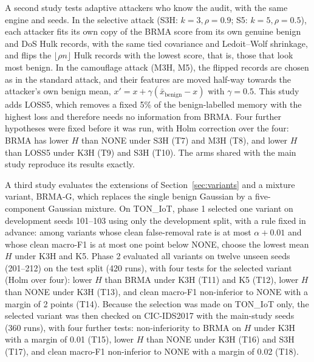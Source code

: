 \documentclass[pdflatex,sn-mathphys-num]{sn-jnl}
\theoremstyle{thmstyleone}
\theoremstyle{thmstylethree}
\begin{document}
A second study tests adaptive attackers who know the audit, with the same engine and seeds. In the selective attack (S3H: $k=3,\rho=0.9$; S5: $k=5,\rho=0.5$), each attacker fits its own copy of the BRMA score from its own genuine benign and DoS Hulk records, with the same tied covariance and Ledoit--Wolf shrinkage, and flips the $\lfloor\rho n\rfloor$ Hulk records with the lowest score, that is, those that look most benign. In the camouflage attack (M3H, M5), the flipped records are chosen as in the standard attack, and their features are moved half-way towards the attacker's own benign mean, $x'=x+\gamma(\bar x_{\mathrm{benign}}-x)$ with $\gamma=0.5$. This study adds LOSS5, which removes a fixed 5\% of the benign-labelled memory with the highest loss and therefore needs no information from BRMA. Four further hypotheses were fixed before it was run, with Holm correction over the four: BRMA has lower $H$ than NONE under S3H (T7) and M3H (T8), and lower $H$ than LOSS5 under K3H (T9) and S3H (T10). The arms shared with the main study reproduce its results exactly.

A third study evaluates the extensions of Section~\ref{sec:variants} and a mixture variant, BRMA-G, which replaces the single benign Gaussian by a five-component Gaussian mixture. On TON\_IoT, phase 1 selected one variant on development seeds 101--103 using only the development split, with a rule fixed in advance: among variants whose clean false-removal rate is at most $\alpha+0.01$ and whose clean macro-F1 is at most one point below NONE, choose the lowest mean $H$ under K3H and K5. Phase 2 evaluated all variants on twelve unseen seeds (201--212) on the test split (420 runs), with four tests for the selected variant (Holm over four): lower $H$ than BRMA under K3H (T11) and K5 (T12), lower $H$ than NONE under K3H (T13), and clean macro-F1 non-inferior to NONE with a margin of 2 points (T14). Because the selection was made on TON\_IoT only, the selected variant was then checked on CIC-IDS2017 with the main-study seeds (360 runs), with four further tests: non-inferiority to BRMA on $H$ under K3H with a margin of 0.01 (T15), lower $H$ than NONE under K3H (T16) and S3H (T17), and clean macro-F1 non-inferior to NONE with a margin of 0.02 (T18).
\end{document}
